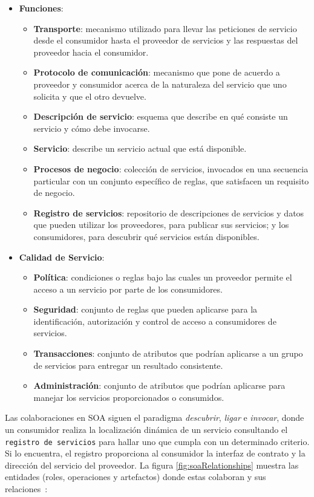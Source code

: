 \begin{itemize}
\item \textbf{Funciones}:
  \begin{itemize}
  \item \textbf{Transporte}: mecanismo utilizado para llevar las peticiones
de servicio desde el consumidor hasta el proveedor de servicios y las
respuestas del proveedor hacia el consumidor.
  \item \textbf{Protocolo de comunicación}: mecanismo que pone de acuerdo
a proveedor y consumidor acerca de la naturaleza del servicio que uno solicita
y que el otro devuelve.
  \item \textbf{Descripción de servicio}: esquema que describe en qué
consiste un servicio y cómo debe invocarse.
  \item \textbf{Servicio}: describe un servicio actual que está disponible.
  \item \textbf{Procesos de negocio}: colección de servicios, invocados 
en una secuencia particular con un conjunto específico de reglas, que
satisfacen un requisito de negocio.
  \item \textbf{Registro de servicios}: repositorio de descripciones de 
servicios y datos que pueden utilizar los proveedores, para publicar sus
servicios; y los consumidores, para descubrir qué servicios están disponibles.
  \end{itemize}
\item \textbf{Calidad de Servicio}:
  \begin{itemize}
  \item \textbf{Política}: condiciones o reglas bajo las cuales un proveedor
permite el acceso a un servicio por parte de los consumidores.
  \item \textbf{Seguridad}: conjunto de reglas que pueden aplicarse para la
identificación, autorización y control de acceso a consumidores de servicios.
  \item \textbf{Transacciones}: conjunto de atributos que podrían 
aplicarse a un grupo de servicios para entregar un resultado consistente.
  \item \textbf{Administración}: conjunto de atributos que podrían 
aplicarse para manejar los servicios proporcionados o consumidos.
  \end{itemize}
\end{itemize}

Las colaboraciones en \acs{SOA} siguen el paradigma \emph{descubrir},
\emph{ligar} e \emph{invocar}, donde un consumidor realiza la localización
dinámica de un servicio consultando el \texttt{registro de servicios} para
hallar uno que cumpla con un determinado criterio. Si lo encuentra, el
registro proporciona al consumidor la interfaz de contrato y la dirección del
servicio del proveedor. La figura \ref{fig:soaRelationships} muestra las
entidades (roles, operaciones y artefactos) donde estas colaboran y sus
relaciones~\cite{bib:soa}:

